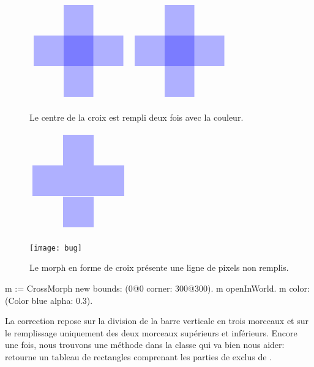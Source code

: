 \documentclass[a4paper,10pt,twoside]{book}
\begin{document}
\begin{figure}[t]
\begin{minipage}{0.48\textwidth}
	\ifluluelse
		{\centerline{\includegraphics[scale=0.6]{overdrawBug}}}
		{\centerline{\includegraphics{overdrawBug}}}
	\caption{Le centre de la croix est rempli deux fois avec la
      couleur.	\label{fig:overdrawBug}}
\end{minipage}
\hfill
\begin{minipage}{0.48\textwidth}
	\ifluluelse
		{\centerline{\includegraphics[scale=0.6]{hairlineBug}}}
		{\centerline{\texttt{[image: bug]}}}
	\caption{Le morph en forme de croix présente une ligne de pixels
      non remplis.	\label{fig:bug}}
\end{minipage}
\end{figure}


\begin{code}{}
m := CrossMorph new bounds: (0@0 corner: 300@300).
m openInWorld.
m color: (Color blue alpha: 0.3).

\end{code}

\noindent
La correction repose sur la division de la barre verticale en trois
morceaux et sur le remplissage uniquement des deux morceaux
supérieurs et inférieurs.
Encore une fois, nous trouvons une méthode dans la classe
 qui va bien nous aider:  
retourne un tableau de rectangles comprenant les parties de 
exclus de . 
\end{document}
